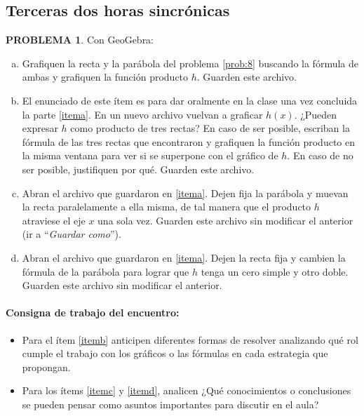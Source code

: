 \documentclass[oneside,spanish]{amsart}
\numberwithin{equation}{section}
\numberwithin{figure}{section}
\theoremstyle{definition}
\newtheorem{problema}{\normalfont PROBLEMA}
\begin{document}
\subsection{Terceras dos horas sincrónicas}\label{terceras-dos}

\begin{problema}\label{prob:9}
	Con GeoGebra:
	
	\begin{enumerate}[a.]
		\item Grafiquen la recta y la parábola del problema \ref{prob:8} buscando la fórmula de ambas y grafiquen la función producto $h$. Guarden este archivo.\label{itema}
		\item El enunciado de este ítem es para dar oralmente en la clase una vez concluida la parte \ref{itema}. En un nuevo archivo vuelvan a graficar $h(x)$. ¿Pueden expresar $h$ como producto de tres rectas? En caso de ser posible, escriban la fórmula de las tres rectas que encontraron y grafiquen la función producto en la misma ventana para ver si se superpone con el gráfico de $h$. En caso de no ser posible, justifiquen por qué. Guarden este archivo.\label{itemb}
		\item Abran el archivo que guardaron en \ref{itema}. Dejen fija la parábola y muevan la recta paralelamente a ella misma, de tal manera que el producto $h$ atraviese el eje $x$ una sola vez. Guarden este archivo sin modificar el anterior (ir a “\textit{Guardar como}”).\label{itemc}
		\item Abran el archivo que guardaron en \ref{itema}. Dejen la recta fija y cambien la fórmula de la parábola para lograr que $h$ tenga un cero simple y otro doble. Guarden este archivo sin modificar el anterior.\label{itemd}
	\end{enumerate}
\end{problema}

\paragraph{Consigna de trabajo del encuentro:}

\begin{itemize}[-]
	\item Para el ítem \ref{itemb} anticipen diferentes formas de resolver analizando qué rol cumple el trabajo con los gráficos o las fórmulas en cada estrategia que propongan.
	
	\item Para los ítems \ref{itemc} y \ref{itemd}, analicen ¿Qué conocimientos o conclusiones se pueden pensar como asuntos importantes para discutir en el aula?
\end{itemize}
\end{document}
